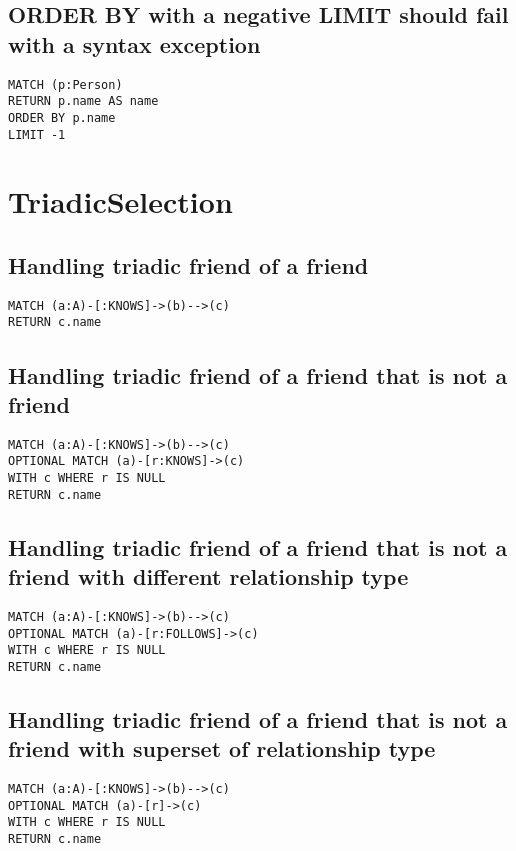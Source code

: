 \subsection{ORDER BY with a negative LIMIT should fail with a syntax exception}

\begin{lstlisting}
MATCH (p:Person)
RETURN p.name AS name
ORDER BY p.name
LIMIT -1
\end{lstlisting}
\section{TriadicSelection}


\subsection{Handling triadic friend of a friend}

\begin{lstlisting}
MATCH (a:A)-[:KNOWS]->(b)-->(c)
RETURN c.name
\end{lstlisting}

\subsection{Handling triadic friend of a friend that is not a friend}

\begin{lstlisting}
MATCH (a:A)-[:KNOWS]->(b)-->(c)
OPTIONAL MATCH (a)-[r:KNOWS]->(c)
WITH c WHERE r IS NULL
RETURN c.name
\end{lstlisting}

\subsection{Handling triadic friend of a friend that is not a friend with different relationship type}

\begin{lstlisting}
MATCH (a:A)-[:KNOWS]->(b)-->(c)
OPTIONAL MATCH (a)-[r:FOLLOWS]->(c)
WITH c WHERE r IS NULL
RETURN c.name
\end{lstlisting}

\subsection{Handling triadic friend of a friend that is not a friend with superset of relationship type}

\begin{lstlisting}
MATCH (a:A)-[:KNOWS]->(b)-->(c)
OPTIONAL MATCH (a)-[r]->(c)
WITH c WHERE r IS NULL
RETURN c.name
\end{lstlisting}

